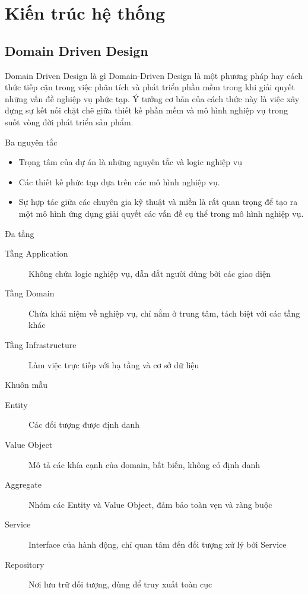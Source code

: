 \section{Kiến trúc hệ thống}

\subsection{Domain Driven Design}

\begin{frame}{Domain Driven Design là gì}
	Domain-Driven Design là một phương pháp hay cách thức tiếp cận trong việc phân tích và phát triển phần mềm trong khi giải quyết những vấn đề nghiệp vụ phức tạp. Ý tưởng cơ bản của cách thức này là việc xây dựng sự kết nối chặt chẽ giữa thiết kế phần mềm và mô hình nghiệp vụ trong suốt vòng đời phát triển sản phẩm.
\end{frame}

\begin{frame}{Ba nguyên tắc}
	\begin{itemize}
		\item Trọng tâm của dự án là những nguyên tắc và logic nghiệp vụ
		\item Các thiết kế phức tạp dựa trên các mô hình nghiệp vụ.
		\item Sự hợp tác giữa các chuyên gia kỹ thuật và miền là rất quan trọng để tạo ra một mô hình ứng dụng giải quyết các vấn đề cụ thể trong mô hình nghiệp vụ.
	\end{itemize}
\end{frame}

\begin{frame}{Đa tầng}
	\begin{description}
		\item[Tầng Application] Không chứa logic nghiệp vụ, dẫn dắt người dùng bởi các giao diện
		\item[Tầng Domain] Chứa khái niệm về nghiệp vụ, chỉ nằm ở trung tâm, tách biệt với các tầng khác
		\item[Tầng Infrastructure] Làm việc trực tiếp với hạ tầng và cơ sở dữ liệu
	\end{description}
\end{frame}

\begin{frame}{Khuôn mẫu}
	\begin{description}
		\item[Entity] Các đối tượng được định danh
		\item[Value Object] Mô tả các khía cạnh của domain, bất biến, không có định danh
		\item[Aggregate] Nhóm các Entity và Value Object, đảm bảo toàn vẹn và ràng buộc
		\item[Service] Interface của hành động, chỉ quan tâm đến đối tượng xử lý bởi Service
		\item[Repository] Nơi lưu trữ đối tượng, dùng để truy xuất toàn cục
	\end{description}
\end{frame}

